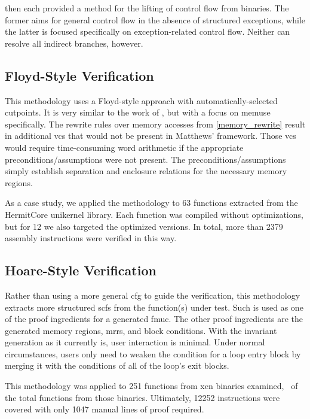  then each provided a method for the lifting of control flow from binaries.
The former aims for general control flow in the absence of structured exceptions, while the latter is focused specifically on exception-related control flow.
Neither can resolve all indirect branches, however.

\subsection{Floyd-Style Verification}
This methodology uses a Floyd-style approach \autocite{floyd1967assigning}
with automatically-selected cutpoints.
It is very similar to the work of \textcite{matthews2006verification},
but with a focus on \gls{memuse} specifically.
The rewrite rules over memory accesses from \cref{memory_rewrite}
result in additional \glspl{vc} that would not be present in Matthews' framework.
Those \glspl{vc} would require time-consuming word arithmetic if the appropriate preconditions/assumptions were not present.
The preconditions/assumptions simply establish separation and enclosure relations for the necessary memory regions.

As a case study, we applied the methodology to \num{63} functions extracted from the HermitCore unikernel library.
Each function was compiled without optimizations, but for \num{12} we also targeted the optimized versions.
In total, more than \num{2379} assembly instructions were verified in this way.

\subsection{Hoare-Style Verification}
Rather than using a more general \gls{cfg} to guide the verification,
this methodology extracts more structured \glspl{scf} from the function(s) under test.
Such  is used as one of the proof ingredients for a generated \gls{fmuc}.
The other proof ingredients are the generated memory regions, \glspl{mrr}, and block conditions.
With the invariant generation as it currently is, user interaction is minimal.
Under normal circumstances, users only need to weaken the condition for a loop entry block by merging it with the conditions of all of the loop's exit blocks.

This methodology was applied to \num{251} functions from \gls{xen} binaries examined, \xenpercentage\ of the total functions from those binaries.
Ultimately, \num{12252} instructions were covered with only \num{1047} manual lines of proof required.

